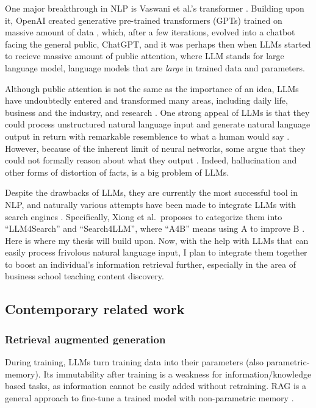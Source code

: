 \documentclass[final-report]{report-template}
\begin{document}
One major breakthrough in NLP is Vaswani et al.'s transformer \cite{transformer}. 
Building upon it, OpenAI created generative pre-trained transformers (GPTs)
trained on massive amount of data \cite{gpt1}, which, after a few iterations,
evolved into a chatbot facing the general public, ChatGPT, and it was perhaps
then when LLMs started to recieve massive amount of public attention, where LLM
stands for large language model, language models that are \emph{large} in trained
data and parameters.

Although public attention is not the same as the importance of an idea, LLMs
have undoubtedly entered and transformed many areas, including daily life,
business and the industry, and research \cite{llm.impact.1}. One strong appeal
of LLMs is that they could process unstructured natural language input and generate
natural language output in return with remarkable resemblence to what a human
would say \cite{llm.power.1, llm.power.2}. However, because of the inherent
limit of neural networks, some argue that they could not formally reason about
what they output \cite{llm.limit.1, llm.limit.2, llm.limit.3}. Indeed,
hallucination \cite{llm.hallucination.1, llm.hallucination.2} and other forms
of distortion of facts, is a big problem of LLMs.

Despite the drawbacks of LLMs, they are currently the most successful tool in
NLP, and naturally various attempts have been made to integrate LLMs with search
engines \cite{llm.meet.search.1, llm.meet.search.2, llm.meet.search.3}.
Specifically, Xiong et al.\ proposes to categorize them into ``LLM4Search'' and
``Search4LLM'', where ``A4B'' means using A to improve B
\cite{llm.meet.search.1}. Here is where my thesis will build upon.  Now, with
the help with LLMs that can easily process frivolous natural language input, I
plan to integrate them together to boost an individual's information retrieval
further, especially in the area of business school teaching content discovery.

\subsection{Contemporary related work} \label{sec.related.work}
\subsubsection{Retrieval augmented generation}
During training, LLMs turn training data into their parameters (also
parametric-memory). Its immutability after training is a
weakness for information/knowledge based tasks, as information
cannot be easily added without retraining. RAG is a general approach to
fine-tune a trained model with non-parametric memory \cite{rag}. 
\end{document}
